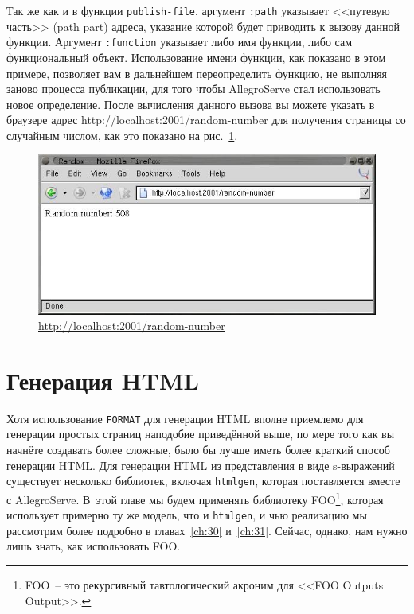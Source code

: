 Так же как и в функции \lstinline{publish-file}, аргумент \lstinline{:path} указывает <<путевую
часть>> (path part) адреса, указание которой будет приводить к вызову данной функции.
Аргумент \lstinline{:function} указывает либо имя функции, либо сам функциональный объект.
Использование имени функции, как показано в этом примере, позволяет вам в дальнейшем
переопределить функцию, не выполняя заново процесса публикации, для того чтобы AllegroServe
стал использовать новое определение. После вычисления данного вызова вы можете указать в
браузере адрес http://localhost:2001/random-number для получения страницы со случайным
числом, как это показано на рис.~\ref{fig:26-3}.

\begin{figure}[htb]
  \centering
  \includegraphics[scale=0.7]{images/random-number.jpg}
  \caption{\url{http://localhost:2001/random-number}}
  \label{fig:26-3}
\end{figure}

\section{Генерация HTML}

Хотя использование \lstinline{FORMAT} для генерации HTML вполне приемлемо для
генерации простых страниц наподобие приведённой выше, по мере того как вы начнёте
создавать более сложные, было бы лучше иметь более краткий способ генерации HTML. Для
генерации HTML из представления в виде s-выражений существует несколько библиотек,
включая \lstinline{htmlgen}, которая поставляется вместе с AllegroServe. В~этой главе мы будем
применять библиотеку FOO\footnote{FOO~-- это рекурсивный тавтологический
  акроним для <<FOO Outputs Output>>.}, которая использует примерно ту же модель, что и
\texttt{htmlgen}, и чью реализацию мы рассмотрим более подробно в главах~\ref{ch:30}
и~\ref{ch:31}. Сейчас, однако, нам нужно лишь знать, как использовать FOO.

